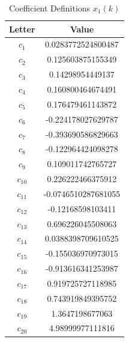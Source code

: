 \begin{table}[H]
\centering
\caption{Coefficient Definitions $x_{1}(k)$}
\label{tab:coefficients1}
\begin{tabular}{|c|c|}
\hline
\textbf{Letter} & \textbf{Value} \\
\hline
$c_1$ & 0.0283772524800487 \\
$c_2$ & 0.125603875155349 \\
$c_3$ & 0.14298954449137 \\
$c_4$ & 0.160800464674491 \\
$c_5$ & 0.176479461143872 \\
$c_6$ & -0.224178027629787 \\
$c_7$ & -0.393690586829663 \\
$c_8$ & -0.122964424098278 \\
$c_9$ & 0.109011742765727 \\
$c_{10}$ & 0.226222466375912 \\
$c_{11}$ & -0.0746510287681055 \\
$c_{12}$ & -0.12168598103411 \\
$c_{13}$ & 0.696226045508063 \\
$c_{14}$ & 0.0388398709610525 \\
$c_{15}$ & -0.155036970973015 \\
$c_{16}$ & -0.913616341253987 \\
$c_{17}$ & 0.919725727118985 \\
$c_{18}$ & 0.743919849395752 \\
$c_{19}$ & 1.3647198677063 \\
$c_{20}$ & 4.98999977111816 \\
\hline
\end{tabular}
\end{table}
